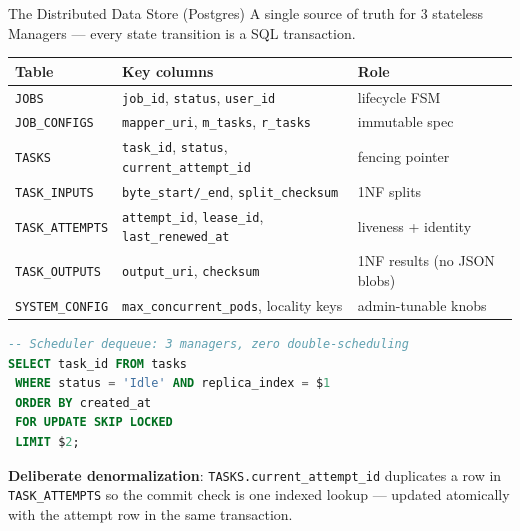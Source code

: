 \documentclass[11pt]{beamer}
\begin{document}
\begin{frame}[fragile]{The Distributed Data Store (Postgres)}
A single source of truth for 3 stateless Managers --- \alert{every state transition is a SQL transaction}.

\vspace{0.4em}
\scriptsize
\begin{table}
\centering
\begin{tabular}{lll}
\toprule
Table             & Key columns                                              & Role \\
\midrule
\texttt{JOBS}             & \texttt{job\_id}, \texttt{status}, \texttt{user\_id}                        & lifecycle FSM \\
\texttt{JOB\_CONFIGS}     & \texttt{mapper\_uri}, \texttt{m\_tasks}, \texttt{r\_tasks}                  & immutable spec \\
\texttt{TASKS}            & \texttt{task\_id}, \texttt{status}, \alert{\texttt{current\_attempt\_id}}   & fencing pointer \\
\texttt{TASK\_INPUTS}     & \texttt{byte\_start/\_end}, \texttt{split\_checksum}                        & 1NF splits \\
\texttt{TASK\_ATTEMPTS}   & \texttt{attempt\_id}, \texttt{lease\_id}, \texttt{last\_renewed\_at}        & liveness + identity \\
\texttt{TASK\_OUTPUTS}    & \texttt{output\_uri}, \texttt{checksum}                                     & 1NF results (no JSON blobs) \\
\texttt{SYSTEM\_CONFIG}   & \texttt{max\_concurrent\_pods}, locality keys                               & admin-tunable knobs \\
\bottomrule
\end{tabular}
\end{table}

\vspace{0.3em}
\begin{lstlisting}[language=SQL]
-- Scheduler dequeue: 3 managers, zero double-scheduling
SELECT task_id FROM tasks
 WHERE status = 'Idle' AND replica_index = $1
 ORDER BY created_at
 FOR UPDATE SKIP LOCKED
 LIMIT $2;
\end{lstlisting}

\scriptsize
\textbf{Deliberate denormalization}: \texttt{TASKS.current\_attempt\_id} duplicates a row in
\texttt{TASK\_ATTEMPTS} so the commit check is \alert{one indexed lookup} ---
updated atomically with the attempt row in the same transaction.
\end{frame}
\end{document}
